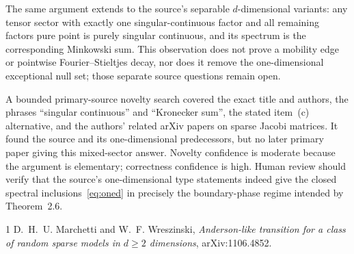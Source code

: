 \documentclass[11pt,a4paper]{article}
\begin{document}
The same argument extends to the source's separable $d$-dimensional variants:
any tensor sector with exactly one singular-continuous factor and all
remaining factors pure point is purely singular continuous, and its spectrum
is the corresponding Minkowski sum.  This observation does not prove a
mobility edge or pointwise Fourier--Stieltjes decay, nor does it remove the
one-dimensional exceptional null set; those separate source questions remain
open.

A bounded primary-source novelty search covered the exact title and authors,
the phrases ``singular continuous'' and ``Kronecker sum'', the stated item~(c)
alternative, and the authors' related arXiv papers on sparse Jacobi matrices.
It found the source and its one-dimensional predecessors, but no later primary
paper giving this mixed-sector answer.  Novelty confidence is moderate because
the argument is elementary; correctness confidence is high.  Human review
should verify that the source's one-dimensional type statements indeed give
the closed spectral inclusions~\eqref{eq:oned} in precisely the boundary-phase
regime intended by Theorem~2.6.

\begin{thebibliography}{1}
D.~H.~U. Marchetti and W.~F. Wreszinski,
\emph{Anderson-like transition for a class of random sparse models in
$d\geq2$ dimensions}, arXiv:1106.4852.
\end{thebibliography}
\end{document}
